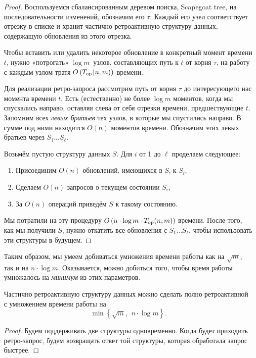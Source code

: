 \begin{proof}
	Воспользуемся сбалансированным деревом поиска, Scapegoat tree, на последовательности изменений, обозначим его $\tau$. Каждый его узел соответствует отрезку в списке и хранит частично ретроактивную структуру данных, содержащую обновления из этого отрезка.

	Чтобы вставить или удалить некоторое обновление в конкретный момент времени $t$, нужно «потрогать» $\log m$~узлов, составляющих путь к $t$ от корня $\tau$, на работу с каждым узлом тратя $O \left( T_{\mathrm{op}} (n,m) \right)$ времени.
	
	Для реализации ретро-запроса рассмотрим путь от корня $\tau$ до интересующего нас момента времени $t$. Есть (естественно) не более $\log m$ моментов, когда мы спускались направо, оставляя слева от себя отрезки времени, предшествующие $t$. Запомним всех {\itshape левых братьев} тех узлов, в которые мы спустились направо. В сумме под ними находится $O(n)$ моментов времени. Обозначим этих левых братьев через $S_1 \ldots S_\ell$.

	Возьмём пустую структуру данных $S$. Для $i$ от 1 до $\ell$ проделаем следующее:
     \begin{enumerate}
	\item Присоединим $O(n)$ обновлений, имеющихся в $S$, к $S_i$,
	\item Сделаем $O(n)$ запросов о текущем состоянии $S_i$,
	\item За $O(n)$ операций приведём $S$ к такому состоянию.
     \end{enumerate}

	Мы потратили на эту процедуру $O \left( n \cdot \log m \cdot T_{\mathrm{op}} (n,m) \right)$ времени. После того, как мы получили $S$, нужно откатить все обновления с $S_1 \ldots S_\ell$, чтобы использовать эти структуры в будущем.
\end{proof}

Таким образом, мы умеем добиваться умножения времени работы как на $\sqrt{m}$, так и на $n \cdot \log m$. Оказывается, можно добиться того, чтобы время работы умножалось на {\it минимум} из этих параметров.

\begin{corollary}
	Частично ретроактивную структуру данных можно сделать полно ретроактивной с умножением времени работы на
     \begin{equation*}
	\min \left\{ \sqrt m,\ \ n \cdot \log m \right\}.
     \end{equation*}
\end{corollary}

\begin{proof}
	Будем поддерживать две структуры одновременно. Когда будет приходить ретро-запрос, будем возвращать ответ той структуры, которая обработала запрос быстрее.
\end{proof}
